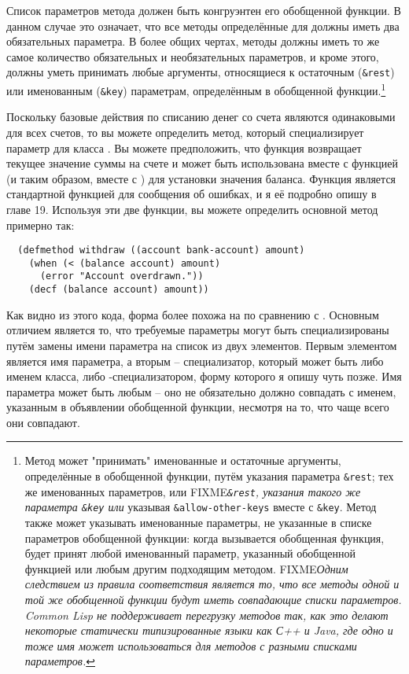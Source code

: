 Список параметров метода должен быть конгруэнтен его обобщенной функции.  В данном случае
это означает, что все методы определённые для  должны иметь два
обязательных параметра.  В более общих чертах, методы должны иметь то же самое количество
обязательных и необязательных параметров, и кроме этого, должны уметь принимать любые
аргументы, относящиеся к остаточным (\lstinline!&rest!) или именованным (\lstinline!&key!)
параметрам, определённым в обобщенной функции.\footnote{Метод может "принимать"
  именованные и остаточные аргументы, определённые в обобщенной функции, путём указания
  параметра \lstinline!&rest!; тех же именованных параметров, или
  FIXME\textit{\lstinline!&rest!, указания такого же параметра \lstinline!&key! или}
  указывая \lstinline!&allow-other-keys! вместе с \lstinline!&key!.  Метод также может
  указывать именованные параметры, не указанные в списке параметров обобщенной функции:
  когда вызывается обобщенная функция, будет принят любой именованный параметр, указанный
  обобщенной функцией или любым другим подходящим методом.  FIXME\textit{Одним следствием
    из правила соответствия является то, что все методы одной и той же обобщенной функции
    будут иметь совпадающие списки параметров.  Common Lisp не поддерживает перегрузку
    методов так, как это делают некоторые статически типизированные языки как С++ и Java,
    где одно и тоже имя может использоваться для методов с разными списками параметров.}
}

Поскольку базовые действия по списанию денег со счета являются одинаковыми для всех
счетов, то вы можете определить метод, который специализирует параметр  для
класса .  Вы можете предположить, что функция  возвращает
текущее значение суммы на счете и может быть использована вместе с функцией  (и
таким образом, вместе с ) для установки значения баланса.  Функция 
является стандартной функцией для сообщения об ошибках, и я её подробно опишу в главе 19.
Используя эти две функции, вы можете определить основной метод  примерно
так:

\begin{lstlisting}
  (defmethod withdraw ((account bank-account) amount)
    (when (< (balance account) amount)
      (error "Account overdrawn."))
    (decf (balance account) amount))
\end{lstlisting}

Как видно из этого кода, форма  более похожа на  по сравнению
с .  Основным отличием является то, что требуемые параметры могут быть
специализированы путём замены имени параметра на список из двух элементов.  Первым
элементом является имя параметра, а вторым -- специализатор, который может быть либо
именем класса, либо -специализатором, форму которого я опишу чуть позже.  Имя
параметра может быть любым -- оно не обязательно должно совпадать с именем, указанным в
объявлении обобщенной функции, несмотря на то, что чаще всего они совпадают.

